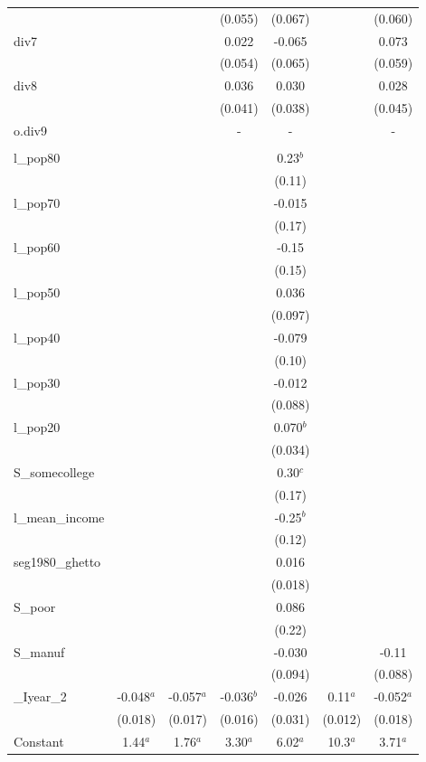 \documentclass[]{article}
\begin{document}
\begin{tabular}{lcccccc}
 &  &  & (0.055) & (0.067) &  & (0.060) \\
div7 &  &  & 0.022 & -0.065 &  & 0.073 \\
 &  &  & (0.054) & (0.065) &  & (0.059) \\
div8 &  &  & 0.036 & 0.030 &  & 0.028 \\
 &  &  & (0.041) & (0.038) &  & (0.045) \\
o.div9 &  &  & - & - &  & - \\
 &  &  &  &  &  &  \\
l\_pop80 &  &  &  & 0.23$^b$ &  &  \\
 &  &  &  & (0.11) &  &  \\
l\_pop70 &  &  &  & -0.015 &  &  \\
 &  &  &  & (0.17) &  &  \\
l\_pop60 &  &  &  & -0.15 &  &  \\
 &  &  &  & (0.15) &  &  \\
l\_pop50 &  &  &  & 0.036 &  &  \\
 &  &  &  & (0.097) &  &  \\
l\_pop40 &  &  &  & -0.079 &  &  \\
 &  &  &  & (0.10) &  &  \\
l\_pop30 &  &  &  & -0.012 &  &  \\
 &  &  &  & (0.088) &  &  \\
l\_pop20 &  &  &  & 0.070$^b$ &  &  \\
 &  &  &  & (0.034) &  &  \\
S\_somecollege &  &  &  & 0.30$^c$ &  &  \\
 &  &  &  & (0.17) &  &  \\
l\_mean\_income &  &  &  & -0.25$^b$ &  &  \\
 &  &  &  & (0.12) &  &  \\
seg1980\_ghetto &  &  &  & 0.016 &  &  \\
 &  &  &  & (0.018) &  &  \\
S\_poor &  &  &  & 0.086 &  &  \\
 &  &  &  & (0.22) &  &  \\
S\_manuf &  &  &  & -0.030 &  & -0.11 \\
 &  &  &  & (0.094) &  & (0.088) \\
\_Iyear\_2 & -0.048$^a$ & -0.057$^a$ & -0.036$^b$ & -0.026 & 0.11$^a$ & -0.052$^a$ \\
 & (0.018) & (0.017) & (0.016) & (0.031) & (0.012) & (0.018) \\
Constant & 1.44$^a$ & 1.76$^a$ & 3.30$^a$ & 6.02$^a$ & 10.3$^a$ & 3.71$^a$ \\

\end{tabular}
\end{document}

